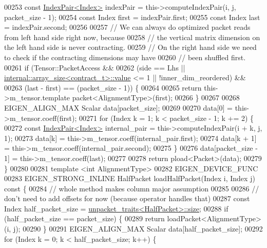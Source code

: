 \begin{DoxyCode}
00253     \textcolor{keyword}{const} \hyperlink{struct_eigen_1_1_index_pair}{IndexPair<Index>} indexPair = this->computeIndexPair(i, j, packet\_size - 1);
00254     \textcolor{keyword}{const} Index first = indexPair.first;
00255     \textcolor{keyword}{const} Index last = indexPair.second;
00256 
00257     \textcolor{comment}{// We can always do optimized packet reads from left hand side right now, because}
00258     \textcolor{comment}{// the vertical matrix dimension on the left hand side is never contracting.}
00259     \textcolor{comment}{// On the right hand side we need to check if the contracting dimensions may have}
00260     \textcolor{comment}{// been shuffled first.}
00261     \textcolor{keywordflow}{if} (Tensor::PacketAccess &&
00262         (side == Lhs || \hyperlink{struct_eigen_1_1internal_1_1array__size}{internal::array\_size<contract\_t>::value} <= 1
       || !inner\_dim\_reordered) &&
00263         (last - first) == (packet\_size - 1)) \{
00264 
00265       \textcolor{keywordflow}{return} this->m\_tensor.template packet<AlignmentType>(first);
00266     \}
00267 
00268     EIGEN\_ALIGN\_MAX Scalar data[packet\_size];
00269 
00270     data[0] = this->m\_tensor.coeff(first);
00271     \textcolor{keywordflow}{for} (Index k = 1; k < packet\_size - 1; k += 2) \{
00272       \textcolor{keyword}{const} \hyperlink{struct_eigen_1_1_index_pair}{IndexPair<Index>} internal\_pair = this->computeIndexPair(i + k, j, 1);
00273       data[k] = this->m\_tensor.coeff(internal\_pair.first);
00274       data[k + 1] = this->m\_tensor.coeff(internal\_pair.second);
00275     \}
00276     data[packet\_size - 1] = this->m\_tensor.coeff(last);
00277 
00278     \textcolor{keywordflow}{return} pload<Packet>(data);
00279   \}
00280 
00281   \textcolor{keyword}{template} <\textcolor{keywordtype}{int} AlignmentType>
00282   EIGEN\_DEVICE\_FUNC
00283   EIGEN\_STRONG\_INLINE HalfPacket loadHalfPacket(Index i, Index j)\textcolor{keyword}{ const }\{
00284     \textcolor{comment}{// whole method makes column major assumption}
00285 
00286     \textcolor{comment}{// don't need to add offsets for now (because operator handles that)}
00287     \textcolor{keyword}{const} Index half\_packet\_size = \hyperlink{struct_eigen_1_1internal_1_1unpacket__traits}{unpacket\_traits<HalfPacket>::size};
00288     \textcolor{keywordflow}{if} (half\_packet\_size == packet\_size) \{
00289       \textcolor{keywordflow}{return} loadPacket<AlignmentType>(i, j);
00290     \}
00291     EIGEN\_ALIGN\_MAX Scalar data[half\_packet\_size];
00292     \textcolor{keywordflow}{for} (Index k = 0; k < half\_packet\_size; k++) \{

\end{DoxyCode}
